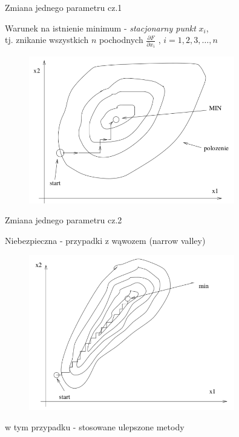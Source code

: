   \begin{frame}{Zmiana jednego parametru cz.1}

	Warunek na istnienie minimum - \emph{stacjonarny punkt} $ x_i $,
	\\tj. znikanie wszystkich $ n $ pochodnych $ \frac{\partial F}{\partial x_i} $ , $ i = 1,2,3,\ldots ,n $
	\begin{figure}
		\centering
		\includegraphics[height=0.6\textheight ,width=0.8\textwidth]{img/17/change_param_1}
	\end{figure}

  \end{frame}

  \begin{frame}{Zmiana jednego parametru cz.2}

	Niebezpieczna - przypadki z wąwozem (narrow valley)
	\begin{figure}
		\centering
		\includegraphics[height=0.6\textheight ,width=0.8\textwidth]{img/17/change_param_2}
	\end{figure}
	w tym przypadku - stosowane ulepszone metody

  \end{frame}

